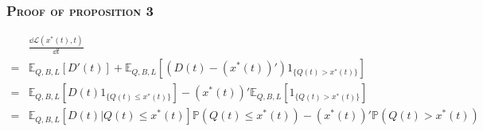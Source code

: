\documentclass[aspectratio=169]{../presentation}
\begin{document}
    \begin{frame}
        \frametitle{\textsc{Proof of proposition 3}}

        \begin{equation}
            \begin{aligned}
                &\frac{\dd \mathcal L(x^*(t), t)}{\dd t} \\
                =& \mathbb E_{Q, B, L}\left[D'(t)\right] + \mathbb{E}_{Q, B, L}\left[(D(t) - (x^*(t))')1_{\{Q(t) > x^*(t)\}}\right] \\
                =& \mathbb E_{Q, B, L}\left[D(t)1_{\{Q(t)\leq x^*(t)\}}\right] - (x^*(t))'\mathbb E_{Q, B, L}\left[1_{\{Q(t)>x^*(t)\}}\right] \\
                =& \mathbb E_{Q, B, L}\left[D(t) | Q(t)\leq x^*(t)\right]\mathbb P(Q(t)\leq x^*(t)) - (x^*(t))'\mathbb P(Q(t) > x^*(t))
            \end{aligned}
        \end{equation}

    \end{frame}
\end{document}

